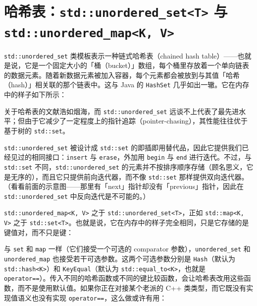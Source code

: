 \section{哈希表：\texttt{std::\allowbreak{}unordered\_\allowbreak{}set<\allowbreak{}T>\allowbreak{}} 与 \texttt{std::\allowbreak{}unordered\_\allowbreak{}map<\allowbreak{}K,\allowbreak{} V>\allowbreak{}}}

\texttt{std::\allowbreak{}unordered\_\allowbreak{}set} 类模板表示一种链式哈希表（chained hash table）——也就是说，它是一个固定大小的「桶（bucket）」数组，每个桶里存放着一个单向链表的数据元素。随着新数据元素被加入容器，每个元素都会被放到与其值「哈希（hash）」相关联的那个链表中。这与 Java 的 \texttt{Hash\allowbreak{}Set} 几乎如出一辙。它在内存中的样子如下所示：


关于哈希表的文献浩如烟海，而 \texttt{std::\allowbreak{}unordered\_\allowbreak{}set} 远谈不上代表了最先进水平；但由于它减少了一定程度上的指针追踪（pointer-chasing），其性能往往优于基于树的 \texttt{std::\allowbreak{}set}。

\texttt{std::\allowbreak{}unordered\_\allowbreak{}set} 被设计成 \texttt{std::\allowbreak{}set} 的即插即用替代品，因此它提供我们已经见过的相同接口：\texttt{insert} 与 \texttt{erase}，外加用 \texttt{begin} 与 \texttt{end} 进行迭代。不过，与 \texttt{std::\allowbreak{}set} 不同，\texttt{std::\allowbreak{}unordered\_\allowbreak{}set} 的元素并不按排序顺序存储（顾名思义，它是无序的），而且它只提供前向迭代器，而不像 \texttt{std::\allowbreak{}set} 那样提供双向迭代器。（看看前面的示意图——那里有「next」指针却没有「previous」指针，因此在 \texttt{std::\allowbreak{}unordered\_\allowbreak{}set} 中反向迭代是不可能的。）

\texttt{std::\allowbreak{}unordered\_\allowbreak{}map<\allowbreak{}K,\allowbreak{} V>\allowbreak{}} 之于 \texttt{std::\allowbreak{}unordered\_\allowbreak{}set<\allowbreak{}T>\allowbreak{}}，正如 \texttt{std::\allowbreak{}map<\allowbreak{}K,\allowbreak{} V>\allowbreak{}} 之于 \texttt{std::\allowbreak{}set<\allowbreak{}T>\allowbreak{}}。也就是说，它在内存中的样子完全相同，只是它存储的是键值对，而不只是键：


与 \texttt{set} 和 \texttt{map} 一样（它们接受一个可选的 comparator 参数），\texttt{unordered\_\allowbreak{}set} 和 \texttt{unordered\_\allowbreak{}map} 也接受若干可选参数。这两个可选参数分别是 \texttt{Hash}（默认为 \texttt{std::\allowbreak{}hash<\allowbreak{}K>\allowbreak{}}）和 \texttt{Key\allowbreak{}Equal}（默认为 \texttt{std::\allowbreak{}equal\_\allowbreak{}to<\allowbreak{}K>\allowbreak{}}，也就是 \texttt{operator==}）。传入不同的哈希函数或不同的键比较函数，会让哈希表改用这些函数，而不是使用默认值。如果你正在对接某个老派的 C++ 类类型，而它既没有实现值语义也没有实现 \texttt{operator==}，这么做或许有用：

